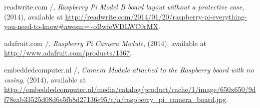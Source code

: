 \documentclass[12pt]{report}
\begin{document}
\begin{thebibliography}{99}
 readwrite.com /, \emph{Raspberry Pi Model B board layout without a protective case}, (2014), available at
\url{http://readwrite.com/2014/01/20/raspberry-pi-everything-you-need-to-know#awesm=~oBwfeWDLWC0rMX}.

 adafruit.com /, \emph{Raspberry Pi Camera Module}, (2014), available at
\url{http://www.adafruit.com/products/1367}.

 embeddedcomputer.nl /, \emph{Camera Module attached to the Raspberry board with no casing}, (2014), available at
\url{http://embeddedcomputer.nl/media/catalog/product/cache/1/image/650x650/9df78eab33525d08d6e5fb8d27136e95/r/a/raspberry_pi_camera_board.jpg}.



\end{thebibliography}
\end{document}
